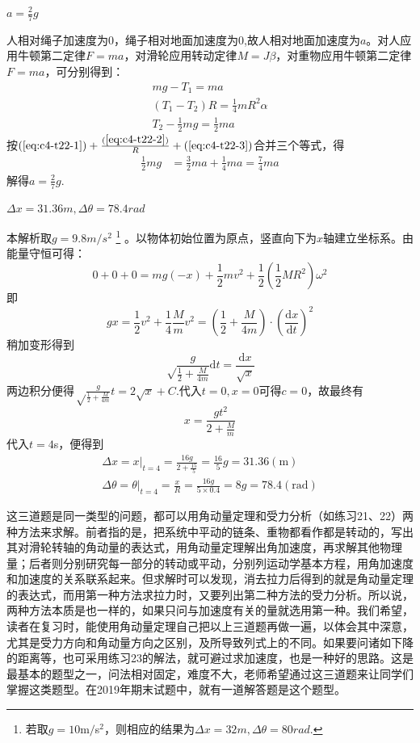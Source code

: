 \documentclass[b5paper,opensource,sourcefont,parskip]{qyxf-book}
\newcommand{\di}[1]{\mathrm{d}#1}
\newcommand{\dy}[2]{\frac{\di{#1}}{\di{#2}}}
\begin{document}
$a=\frac{2}{7}g$

\solve 人相对绳子加速度为0，绳子相对地面加速度为0,故人相对地面加速度为$a$。对人应用牛顿第二定律$F=ma$，对滑轮应用转动定律$M=J\beta$，对重物应用牛顿第二定律$F=ma$，可分别得到：
\begin{gather}
mg-T_1=ma\label{eq:c4-t22-1}\\
(T_1-T_2)R=\frac{1}{4}mR^2\alpha\label{eq:c4-t22-2}\\
T_2-\frac{1}{2}mg=\frac{1}{2}ma\label{eq:c4-t22-3}
\end{gather}
按$(\ref{eq:c4-t22-1})+\frac{(\ref{eq:c4-t22-2})}{R}+(\ref{eq:c4-t22-3})$合并三个等式，得
\begin{align*}
\frac{1}{2}mg&=\frac{3}{2}ma+\frac{1}{4}ma=\frac{7}{4}ma
\end{align*}
解得$a=\frac{2}{7}g.$

$\Delta x=31.36m,\Delta\theta=78.4rad$

\solve 本解析取$ g=9.8m/s^2 $
\footnote{若取$g=10$m$/$s${}^2$，则相应的结果为$\Delta x=32m,\Delta\theta=80rad.$}
。以物体初始位置为原点，竖直向下为$x$轴建立坐标系。由能量守恒可得：
\[0+0+0=mg(-x)+\frac{1}{2}mv^2+\frac{1}{2}\left(\frac{1}{2}MR^2\right)\omega^2\]
即
\[gx=\frac{1}{2}v^2+\frac{1}{4}\frac{M}{m}v^2=\left(\dfrac12+\frac{M}{4m}\right)\cdot\left(\dy{x}{t}\right)^2\]
稍加变形得到
\[\sqrt\frac{g}{\frac{1}{2}+\frac{M}{4m}}\di{t}=\frac{\di{x}}{\sqrt{x}}\]
两边积分便得$\sqrt\frac{g}{\frac{1}{2}+\frac{M}{4m}}t=2\sqrt{x}+C$.代入$ t=0,x=0$可得$c=0$，故最终有
\[x=\frac{gt^2}{2+\frac{M}{m}}\]
代入$t=4$s，便得到
\begin{gather*}
\Delta x=x\left.\right|_{t=4}=\frac{16g}{2+\frac{15}{5}}=\frac{16}{5}g=31.36(\mathrm{m})\\
\Delta\theta=\left.\theta\right|_{t=4}=\frac{x}{R}=\frac{16g}{5\times 0.4}=8g=78.4(\mathrm{rad})
\end{gather*}

\note 这三道题是同一类型的问题，都可以用角动量定理和受力分析（如练习21、22）两种方法来求解。前者指的是，把系统中平动的链条、重物都看作都是转动的，写出其对滑轮转轴的角动量的表达式，用角动量定理解出角加速度，再求解其他物理量；后者则分别研究每一部分的转动或平动，分别列运动学基本方程，用角加速度和加速度的关系联系起来。但求解时可以发现，消去拉力后得到的就是角动量定理的表达式，而用第一种方法求拉力时，又要列出第二种方法的受力分析。所以说，两种方法本质是也一样的，如果只问与加速度有关的量就选用第一种。我们希望，读者在复习时，能使用角动量定理自己把以上三道题再做一遍，以体会其中深意，尤其是受力方向和角动量方向之区别，及所导致列式上的不同。如果要问诸如下降的距离等，也可采用练习23的解法，就可避过求加速度，也是一种好的思路。这是最基本的题型之一，问法相对固定，难度不大，老师希望通过这三道题来让同学们掌握这类题型。在2019年期末试题中，就有一道解答题是这个题型。
\end{document}
